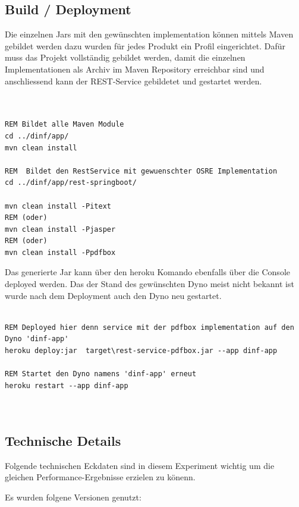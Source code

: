 \documentclass[main.tex]{subfiles}
\begin{document}
\subsection{Build / Deployment}

Die einzelnen Jars mit den gewünschten implementation können mittels Maven gebildet werden dazu wurden für jedes Produkt ein Profil eingerichtet. Dafür muss das Projekt vollständig gebildet werden, damit die einzelnen Implementationen als Archiv im Maven Repository erreichbar sind und anschliessend kann der REST-Service gebildetet und gestartet werden.  

\begin{lstlisting}[language=command.com]


REM Bildet alle Maven Module 
cd ../dinf/app/ 
mvn clean install 

REM  Bildet den RestService mit gewuenschter OSRE Implementation     
cd ../dinf/app/rest-springboot/

mvn clean install -Pitext
REM (oder)
mvn clean install -Pjasper
REM (oder)
mvn clean install -Ppdfbox
\end{lstlisting}


Das generierte Jar kann über den heroku Komando ebenfalls über die Console deployed werden. Das der Stand des gewünschten Dyno meist nicht bekannt ist wurde nach dem Deployment auch den Dyno neu gestartet. 

\begin{lstlisting}[language=command.com]

REM Deployed hier denn service mit der pdfbox implementation auf den Dyno 'dinf-app'
heroku deploy:jar  target\rest-service-pdfbox.jar --app dinf-app

REM Startet den Dyno namens 'dinf-app' erneut
heroku restart --app dinf-app



\end{lstlisting}

\subsection{Technische Details}

Folgende technischen Eckdaten sind in diesem Experiment  wichtig um die gleichen Performance-Ergebnisse erzielen zu könenn. 

Es wurden folgene Versionen genutzt: 
\end{document}

